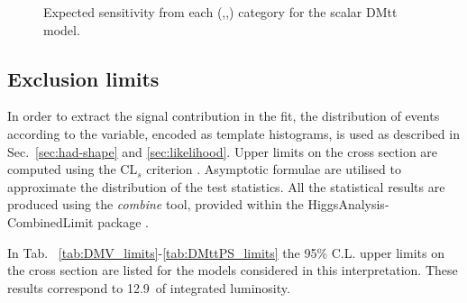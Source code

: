 \begin{figure}[h!] \centering
{}
\caption{Expected sensitivity from each (\nj,\nb,\scalht) category for the scalar DMtt model.}
\label{fig:DMttS-sensitivity} 
\end{figure}


\clearpage
\subsection{Exclusion limits}
In order to extract the signal contribution in the fit, the distribution of
events according to the \mht variable, encoded as template histograms, is used
as described in Sec.~\ref{sec:had-shape} and \ref{sec:likelihood}. Upper limits
on the cross section are computed using the $\text{CL}_{s}$ criterion 
\cite{CLsTechnique}. Asymptotic formulae \cite{AsymptoticFormulae} are utilised
to approximate the distribution of the test statistics. All the statistical
results are produced using the \textit{combine} tool, provided within the
HiggsAnalysis-CombinedLimit package \cite{Combine}.

In Tab. ~\ref{tab:DMV_limits}-\ref{tab:DMttPS_limits} the 95\% C.L. upper limits 
on the cross section are listed for the models considered in this 
interpretation. These results correspond to 12.9~\ifb of integrated luminosity. 

